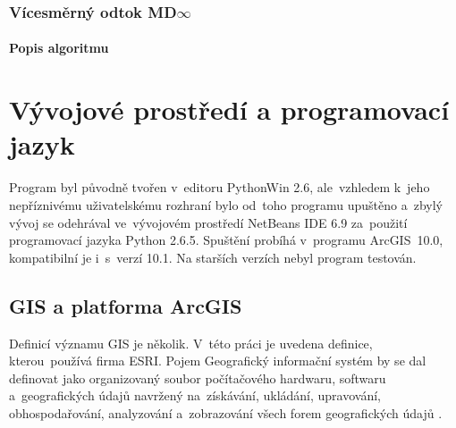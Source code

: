 \subsection{Vícesměrný odtok MD\texorpdfstring{$\infty$}{infty}} \label{subsection:MD}
\subsubsection{Popis algoritmu} \label{section:MD}

\chapter{Vývojové prostředí a programovací jazyk} \label{chapter:programovani}
Program byl původně tvořen v~editoru PythonWin 2.6, ale~vzhledem k~jeho nepříznivému uživatelskému rozhraní bylo od~toho programu upuštěno a~zbylý vývoj se odehrával ve~vývojovém prostředí NetBeans IDE 6.9 za~použití programovací jazyka Python 2.6.5. 
Spuštění probíhá v~programu ArcGIS~10.0, kompatibilní je i~s~verzí 10.1. Na starších verzích nebyl program testován. 

\section{GIS a platforma ArcGIS} \label{section:gis}
Definicí významu GIS je několik. V~této práci je uvedena definice, kterou~používá firma ESRI.
Pojem Geografický informační systém by se dal definovat jako organizovaný soubor počítačového hardwaru, softwaru a~geografických údajů navržený na~získávání, ukládání, upravování, obhospodařování, analyzování a~zobrazování všech forem geografických údajů \cite{gis}.

